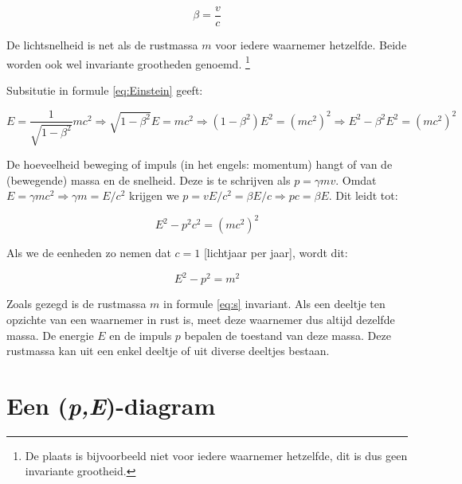 \begin{equation}
\beta=\frac{v}{c}\label{eq:beta}
\end{equation}


De lichtsnelheid is net als de rustmassa $m$ voor iedere waarnemer hetzelfde. 
Beide worden ook wel invariante grootheden genoemd.%
\footnote{De plaats is bijvoorbeeld niet voor iedere waarnemer hetzelfde, dit
is dus geen invariante grootheid.%
} 


Subsitutie in formule \ref{eq:Einstein} geeft:

\begin{equation}
E=\frac{1}{\sqrt{1-\beta^{2}}}mc^{2}
\Rightarrow\sqrt{1-\beta^{2}}E=mc^{2}
\Rightarrow\left(1-\beta^{2}\right)E^{2}=\left(mc^{2}\right)^{2}
\Rightarrow E^{2}-\beta^{2}E^{2}=\left(mc^{2}\right)^{2}
\end{equation}

De hoeveelheid beweging of impuls (in het engels: momentum) hangt
of van de (bewegende) massa en de snelheid. Deze is te schrijven als $p=\gamma mv$.
Omdat $E=\gamma mc^{2}\Rightarrow\gamma m=E/c^{2}$ krijgen we $p=vE/c^{2}=\beta 
E/c\Rightarrow pc=\beta E$. Dit leidt tot:

\begin{equation}
E^{2}-p^{2}c^{2}=\left(mc^{2}\right)^{2}
\end{equation}

Als we de eenheden zo nemen dat $c=1$ [lichtjaar per jaar], wordt
dit:

\begin{equation}
E^{2}-p^{2}=m^{2}\label{eq:s}
\end{equation}

Zoals gezegd is de rustmassa $m$ in formule \ref{eq:s} invariant. Als een deeltje ten 
opzichte van een waarnemer in rust is, meet deze waarnemer dus altijd dezelfde massa. 
De energie $E$ en de impuls $p$ bepalen de toestand van deze massa. Deze rustmassa 
kan uit een enkel deeltje of uit diverse deeltjes bestaan.

\newpage{}

\section{Een (\textit{p,E})-diagram}

